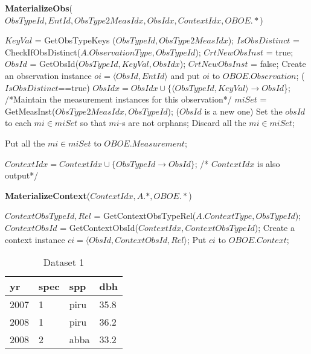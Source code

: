 \documentclass[10pt]{article}
\begin{document}
\begin{algorithm} [htb]
\caption{{\bf MaterializeObs}($ObsTypeId, EntId, ObsType2MeasIdx, ObsIdx, ContextIdx, OBOE.*$)}
{\small 
\begin{algorithmic}
    \STATE $KeyVal$ = GetObsTypeKeys ($ObsTypeId, ObsType2MeasIdx$);
    \STATE $IsObsDistinct$ = CheckIfObsDistinct($A.ObservationType, ObsTypeId$);
		\STATE $CrtNewObsInst$ = true;
		\STATE $ObsId$ = GetObsId($ObsTypeId, KeyVal, ObsIdx$);
		  $CrtNewObsInst$ = false;
	\ENDIF
		\STATE Create an observation instance $oi = \langle ObsId,  EntId\rangle$ and put $oi$ to $OBOE.Observation$;
		 ($IsObsDistinct$==true) $ObsIdx = ObsIdx \cup \{\langle ObsTypeId, KeyVal \rangle \rightarrow ObsId$\};
           \ENDIF
    \STATE
    \STATE /*Maintain the measurement instances for this observation*/
    \STATE $miSet$ = GetMeasInst($ObsType2MeasIdx, ObsTypeId$);
     {($ObsId$ is a new one)}
         Set the $obsId$ to each $mi \in miSet$ so that $mi$-s are not orphans;
         Discard all the $mi \in miSet$;
    
    \STATE Put all the $mi \in miSet$ to $OBOE.Measurement$;
    \STATE

	\STATE $ContextIdx = ContextIdx \cup \{ObsTypeId \rightarrow ObsId\}$; /* $ContextIdx$ is also output*/

\end{algorithmic}
}
\end{algorithm}


\begin{algorithm} [htb]
\caption{{\bf MaterializeContext}($ContextIdx, A.*, OBOE.*$)}
{\small 
\begin{algorithmic}
\STATE $ContextObsTypeId, Rel$ = GetContextObsTypeRel($A.ContextType, ObsTypeId$);
	\STATE $ContextObsId$ = GetContextObsId($ContextIdx, ContextObsTypeId$);
	\STATE Create a context instance $ci=\langle ObsId, ContextObsId, Rel\rangle$;
	\STATE Put $ci$ to $OBOE.Context$;
\ENDIF
\ENDFOR
\end{algorithmic}
}
\end{algorithm}

\begin{table}[htb]
\begin{center}
\begin{tabular}{|l|l|l|l|}
\hline
yr & spec & spp & dbh\\\hline
2007 & 1 & piru & 35.8 \\\hline
2008 & 1 & piru & 36.2 \\\hline
2008 & 2 & abba & 33.2 \\\hline
\end{tabular}
\end{center}
\vspace{-0.2in}
\caption{Dataset 1}
\label{tb:dataset1}
\end{table}
\end{document}
